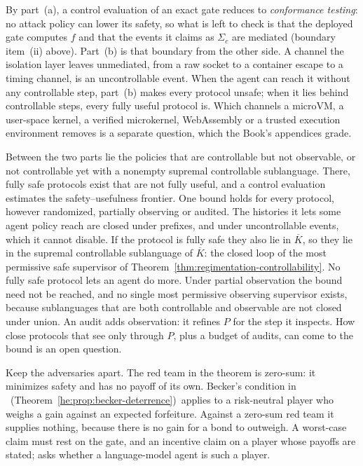 By part~(a), a control evaluation of an exact gate reduces to
\emph{conformance testing}: no attack policy can lower its safety, so what is
left to check is that the deployed gate computes $f$ and that the events it
claims as $\Sigma_c$ are mediated (boundary item~(ii) above). Part~(b) is that
boundary from the other side. A channel the isolation layer leaves
unmediated, from a raw socket to a container escape to a timing channel, is an
uncontrollable event. When the agent can reach it without any controllable
step, part~(b) makes every protocol unsafe; when it lies behind controllable
steps, every fully useful protocol is. Which channels a microVM,
a user-space kernel, a verified microkernel, WebAssembly or a trusted
execution environment removes is a separate question\ifpdbook, which
the Book's appendices grade\fi.

Between the two parts lie the policies that are controllable but not
observable, or not controllable yet with a nonempty supremal controllable
sublanguage. There, fully safe protocols exist that are not fully useful, and
a control evaluation estimates the safety--usefulness frontier. One bound
holds for every protocol, however randomized, partially observing or audited.
The histories it lets some agent policy reach are closed under prefixes, and
under uncontrollable events, which it cannot disable. If the protocol is fully
safe they also lie in $\overline{K}$, so they lie in the supremal controllable
sublanguage of $\overline{K}$: the closed loop of the most permissive safe
supervisor of Theorem~\ref{thm:regimentation-controllability}. No fully safe
protocol lets an agent do more. Under partial observation the bound need not be
reached, and no single most permissive observing supervisor exists, because
sublanguages that are both controllable and observable are not closed under
union. An audit adds observation: it refines $P$ for the step it inspects. How
close protocols that see only through $P$, plus a budget of audits, can come
to the bound is an open question.

Keep the adversaries apart. The red team in the theorem is zero-sum: it
minimizes safety and has no payoff of its own. Becker's condition in
%
\ifpdbook\ (Theorem~\ref{he:prop:becker-deterrence})\fi\
applies to a risk-neutral player who weighs a gain against an expected
forfeiture. Against a zero-sum red team it supplies nothing, because there is
no gain for a bond to outweigh. A worst-case claim must rest on the gate, and
an incentive claim on a player whose payoffs are stated;
 asks whether a language-model agent is
such a player.

